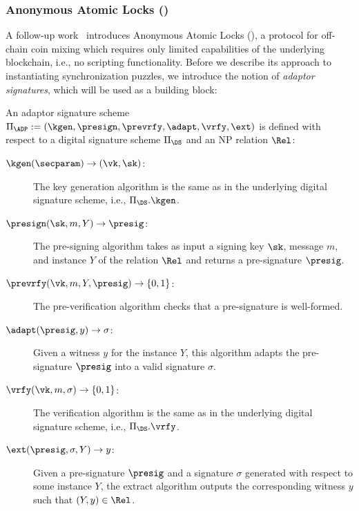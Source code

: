 \subsubsection{Anonymous Atomic Locks (\texorpdfstring{\AAL}{A2L})}

A follow-up work~\cite{SP:TaiMorMaf21} introduces Anonymous Atomic Locks (\AAL), a protocol for off-chain coin mixing which requires only limited capabilities of the underlying blockchain, i.e., no scripting functionality.
Before we describe its approach to instantiating synchronization puzzles, we introduce the notion of \emph{adaptor signatures}, which will be used as a building block:

\begin{definition}
    An adaptor signature scheme $\Pi_\ADP := (\kgen, \presign, \prevrfy, \adapt, \vrfy, \ext)$ is defined with respect to a digital signature scheme $\Pi_\DS$ and an NP relation $\Rel$:
    \begin{description}
        \item[$\kgen(\secparam) \to (\vk, \sk)$:] The key generation algorithm is the same as in the underlying digital signature scheme, i.e., $\Pi_\DS.\kgen$.
        \item[$\presign(\sk, m, Y) \to \presig$:] The pre-signing algorithm takes as input a signing key $\sk$, message $m$, and instance $Y$ of the relation $\Rel$ and returns a pre-signature $\presig$.
        \item[$\prevrfy(\vk, m, Y, \presig) \to \{0, 1\}$:] The pre-verification algorithm checks that a pre-signature is well-formed.
        \item[$\adapt(\presig, y) \to \sigma$:] Given a witness $y$ for the instance $Y$, this algorithm adapts the pre-signature $\presig$ into a valid signature $\sigma$.
        \item[$\vrfy(\vk, m, \sigma) \to \{0, 1\}$:] The verification algorithm is the same as in the underlying digital signature scheme, i.e., $\Pi_\DS.\vrfy$.
        \item[$\ext(\presig, \sigma, Y) \to y$:] Given a pre-signature $\presig$ and a signature $\sigma$ generated with respect to some instance $Y$, the extract algorithm outputs the corresponding witness $y$ such that $(Y, y) \in \Rel$.
    \end{description}
\end{definition}

